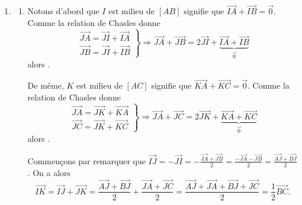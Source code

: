 		\begin{enumerate}
			\item \label{qest: Bac C 2005 Pbm I Part I, 1/}
				\begin{enumerate}
					\item \label{qest: Bac C 2005 Pbm I Part I, 1/ a)}
							Notons d'abord que $I$ est milieu de $[AB]$ signifie que 
							$\overrightarrow{IA} + \overrightarrow{IB} = \vec{0}$.
							Comme la relation de Chasles donne 
							\[
								\left.
									\begin{array}{r}
										\overrightarrow{JA} = \overrightarrow{JI} + \overrightarrow{IA}	\\
										\overrightarrow{JB} = \overrightarrow{JI} + \overrightarrow{IB}
									\end{array}
								\right\rbrace
								\Rightarrow
								\overrightarrow{JA} + \overrightarrow{JB} 
									= 2 \overrightarrow{JI} + \underbrace{\overrightarrow{IA} + \overrightarrow{IB}}_{\vec{0}}
							\]
							alors .
							
							De m\^eme, $K$ est milieu de $[AC]$ signifie que 
							$\overrightarrow{KA} + \overrightarrow{KC} = \vec{0}$.
							Comme la relation de Chasles donne 
							\[
								\left.
									\begin{array}{r}
										\overrightarrow{JA} = \overrightarrow{JK} + \overrightarrow{KA}	\\
										\overrightarrow{JC} = \overrightarrow{JK} + \overrightarrow{KC}
									\end{array}
								\right\rbrace
								\Rightarrow
								\overrightarrow{JA} + \overrightarrow{JC} 
									= 2 \overrightarrow{JK} + \underbrace{\overrightarrow{KA} + \overrightarrow{KC}}_{\vec{0}}
							\]
							alors .

							Commen\c{c}ons par remarquer que 
							$\overrightarrow{IJ} = - \overrightarrow{JI} = - \frac{\overrightarrow{JA}+\overrightarrow{JB}}{2}
							= \frac{-\overrightarrow{JA}-\overrightarrow{JB}}{2} = \frac{\overrightarrow{AJ}+\overrightarrow{BJ}}{2}$.
							On a alors 
							\[
								\overrightarrow{IK} = \overrightarrow{IJ} + \overrightarrow{JK}
									= \frac{\overrightarrow{AJ}+\overrightarrow{BJ}}{2} + \frac{\overrightarrow{JA}+\overrightarrow{JC}}{2}
									= \frac{
										\overrightarrow{AJ}+\overrightarrow{JA}
										+\overrightarrow{BJ}+\overrightarrow{JC}}{2}
									= \frac{1}{2} \overrightarrow{BC} .
							\]


\end{enumerate}
\end{enumerate}
